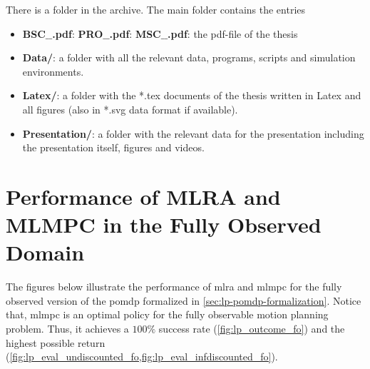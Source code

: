 \begin{appendix}
{	%
	There is a folder
 in the archive. The main folder contains the entries
	\begin{itemize}
		\item {}
		{\textbf{BSC$\_$\NummerDerArbeit$\_$\NachnameDesStudenten.pdf}:}{}
		{\textbf{PRO$\_$\NummerDerArbeit$\_$\NachnameDesStudenten.pdf}:}{}
		{\textbf{MSC$\_$\NummerDerArbeit$\_$\NachnameDesStudenten.pdf}:}{}
		the pdf-file of the thesis
		\item \textbf{Data/}: a folder with all the relevant data, programs, scripts and simulation environments.
		\item \textbf{Latex/}: a folder with the *.tex documents of the thesis
		written in Latex and all figures (also in *.svg data format if available).
		\item \textbf{Presentation/}: a folder with the relevant data for the presentation including the presentation itself, figures and videos.
	\end{itemize}
}{}

\clearpage
\section{Performance of MLRA and MLMPC in the Fully Observed Domain}\label{apx:fo-comparison}

The figures below illustrate the performance of \ac{mlra} and \ac{mlmpc} for
the fully observed version of the \ac{pomdp} formalized in
\cref{sec:lp-pomdp-formalization}. Notice that, \ac{mlmpc} is an optimal policy
for the fully observable motion planning problem. Thus, it achieves a $100\%$
success rate (\cf \cref{fig:lp_outcome_fo}) and the highest possible return
(\cf \cref{fig:lp_eval_undiscounted_fo,fig:lp_eval_infdiscounted_fo}).


\end{appendix}
